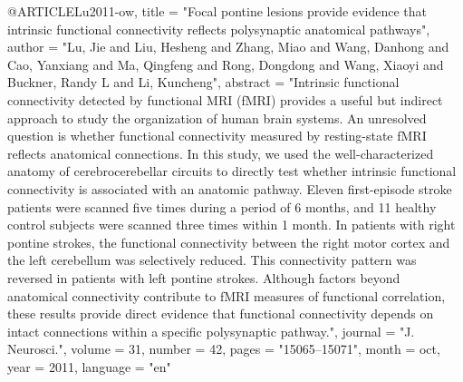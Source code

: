 @ARTICLE{Lu2011-ow,
	title    = "Focal pontine lesions provide evidence that intrinsic functional
	connectivity reflects polysynaptic anatomical pathways",
	author   = "Lu, Jie and Liu, Hesheng and Zhang, Miao and Wang, Danhong and
	Cao, Yanxiang and Ma, Qingfeng and Rong, Dongdong and Wang,
	Xiaoyi and Buckner, Randy L and Li, Kuncheng",
	abstract = "Intrinsic functional connectivity detected by functional MRI
	(fMRI) provides a useful but indirect approach to study the
	organization of human brain systems. An unresolved question is
	whether functional connectivity measured by resting-state fMRI
	reflects anatomical connections. In this study, we used the
	well-characterized anatomy of cerebrocerebellar circuits to
	directly test whether intrinsic functional connectivity is
	associated with an anatomic pathway. Eleven first-episode stroke
	patients were scanned five times during a period of 6 months, and
	11 healthy control subjects were scanned three times within 1
	month. In patients with right pontine strokes, the functional
	connectivity between the right motor cortex and the left
	cerebellum was selectively reduced. This connectivity pattern was
	reversed in patients with left pontine strokes. Although factors
	beyond anatomical connectivity contribute to fMRI measures of
	functional correlation, these results provide direct evidence
	that functional connectivity depends on intact connections within
	a specific polysynaptic pathway.",
	journal  = "J. Neurosci.",
	volume   =  31,
	number   =  42,
	pages    = "15065--15071",
	month    =  oct,
	year     =  2011,
	language = "en"
}
